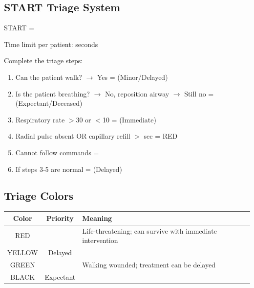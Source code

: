 \documentclass[11pt]{article}
\begin{document}
\subsection{START Triage System}
START = \underline{\hspace{6cm}}

Time limit per patient: \underline{\hspace{2cm}} seconds

Complete the triage steps:

\begin{enumerate}
    \item Can the patient walk? $\rightarrow$ Yes = \underline{\hspace{2cm}} (Minor/Delayed)
    
    \item Is the patient breathing? $\rightarrow$ No, reposition airway $\rightarrow$ Still no = \underline{\hspace{2cm}} (Expectant/Deceased)
    
    \item Respiratory rate $>$30 or $<$10 = \underline{\hspace{2cm}} (Immediate)
    
    \item Radial pulse absent OR capillary refill $>$ \underline{\hspace{1cm}} sec = RED
    
    \item Cannot follow commands = \underline{\hspace{2cm}}
    
    \item If steps 3-5 are normal = \underline{\hspace{2cm}} (Delayed)
\end{enumerate}

\subsection{Triage Colors}
\begin{center}
\begin{tabular}{|c|c|p{7cm}|}
\hline
\textbf{Color} & \textbf{Priority} & \textbf{Meaning} \\
\hline
RED & \underline{\hspace{2cm}} & Life-threatening; can survive with immediate intervention \\
\hline
YELLOW & Delayed & \underline{\hspace{5cm}} \\
\hline
GREEN & \underline{\hspace{2cm}} & Walking wounded; treatment can be delayed \\
\hline
BLACK & Expectant & \underline{\hspace{5cm}} \\
\hline
\end{tabular}
\end{center}
\end{document}
